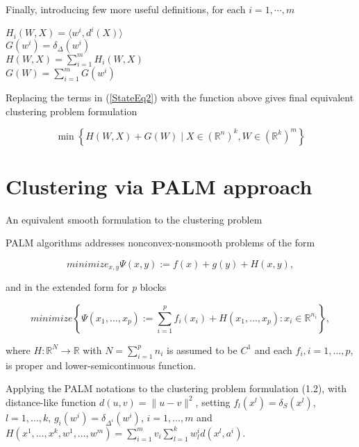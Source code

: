 \documentclass[11pt]{article}
\numberwithin{equation}{section}
\begin{document}
Finally, introducing few more useful definitions, for each $i=1, \cdots , m$

\begin{center}
$H_i(W,X) = \langle w^i , d^i(X) \rangle$
\\ \smallskip
$G(w^i) = \delta_{\Delta}(w^i)$
\\ \smallskip
$H(W,X) = \sum\limits_{i=1}^{m} H_i(W,X)$
\\ \smallskip
 $G(W) = \sum\limits_{i=1}^{m} G(w^i)$
\\
\end{center}

Replacing the terms in (\ref{StateEq2}) with the function above gives final equivalent clustering problem formulation

\begin{equation}
	\min \left\lbrace H(W,X) + G(W) \mid X \in (\mathbb{R}^n)^k , W \in (\mathbb{R}^k)^m \right\rbrace \label{StateEq4}
\end{equation}




\section{Clustering via PALM approach }

An equivalent smooth formulation to the clustering problem


PALM algorithms addresses nonconvex-nonsmooth problems of the form

\begin{equation}
	minimize_{x,y} \Psi(x,y):=f(x)+g(y)+H(x,y) , \label{StateEq13}
\end{equation}

\noindent and in the extended form for \textit{p} blocks

\begin{equation}
	minimize\left\lbrace \Psi(x_1, \dots ,x_p):= \sum\limits_{i=1}^{p}f_i(x_i)+H(x_1, \dots ,x_p) : x_i \in \mathbb{R}^{n_i} \right\rbrace , \label{StateEq14}
\end{equation}

\noindent where $H : \mathbb{R}^N \rightarrow \mathbb{R}$ with $N= \sum^{p}_{i=1} n_i$ is assumed to be $C^1$ and each $f_i , i= 1, \dots ,p$, is proper and lower-semicontinuous function.

Applying the PALM notations to the clustering problem formulation (1.2), with distance-like function $d(u,v)= \| u-v \|^2$, setting $f_l(x^l)= \delta_S(x^l)$, $l=1, \dots ,k $, $g_i(w^i)= \delta_{\Delta^i}(w^i)$, $i=1, \dots ,m$ and $H(x^1, \dots ,x^k,w^1, \dots ,w^m)= \sum\limits_{i=1}^{m} v_i \sum\limits_{l=1}^{k} w^i_l d(x^l , a^i)$.
\end{document}
